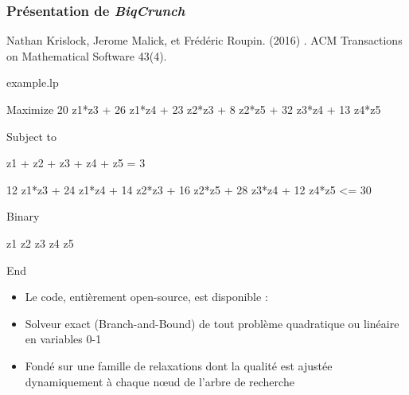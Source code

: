\documentclass{beamer}
\def\bleu#1{{\color{blue}#1}}
\newcommand{\biqcrunch}{\emph{\mbox{BiqCrunch}}}
\begin{document}
\begin{frame}
\frametitle{Présentation de \biqcrunch}

{\tiny
  \begin{thebibliography}
    \beamertemplatearticlebibitems
    
Nathan Krislock, Jerome Malick, et Fr{\'e}d{\'e}ric Roupin. (2016)
.
ACM Transactions on Mathematical Software 43(4).
 
\end{thebibliography}
}

\begin{block}{example.lp}
\begin{small}
Maximize
20 z1*z3 + 26 z1*z4 + 23 z2*z3 + 8 z2*z5 + 32 z3*z4 + 13 z4*z5 

Subject to

  z1 + z2 + z3 + z4 + z5 = 3

  12 z1*z3 + 24 z1*z4 + 14 z2*z3 + 16 z2*z5 + 28 z3*z4 + 12 z4*z5 <= 30

Binary

  z1 z2 z3 z4 z5
  
End
\end{small}
\end{block}


\begin{itemize}
\item Le code, entièrement open-source, est disponible : 
\item Solveur exact (Branch-and-Bound) de \bleu{tout problème quadratique ou linéaire en variables 0-1}
\item Fondé sur une famille de relaxations dont la qualité est \bleu{ajustée dynamiquement} à chaque n\oe ud de l'arbre de recherche
\end{itemize}

\end{frame}
\end{document}
